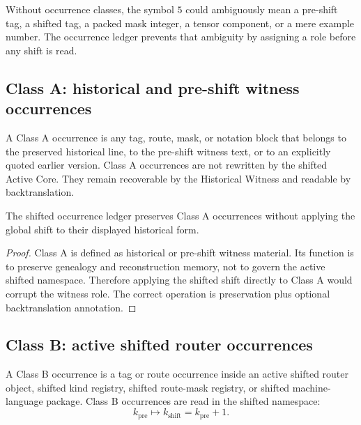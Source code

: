 \begin{remark}
\label{rem:v400-r02-why-occurrence-classes-needed}
Without occurrence classes, the symbol $5$ could ambiguously mean a pre-shift tag,
a shifted tag, a packed mask integer, a tensor component, or a mere example number.
The occurrence ledger prevents that ambiguity by assigning a role before any
shift is read.
\end{remark}

\subsection{Class A: historical and pre-shift witness occurrences}
\label{subsec:v400-r02-class-a-historical-pre-shift}

\begin{definition}
\label{def:v400-r02-class-a-occurrence}
A Class A occurrence is any tag, route, mask, or notation block that belongs to
the preserved historical line, to the pre-shift witness text, or to an explicitly
quoted earlier version. Class A occurrences are not rewritten by the shifted Active
Core. They remain recoverable by the Historical Witness and readable by
backtranslation.
\end{definition}

\begin{lemma}
\label{lem:v400-r02-class-a-preservation}
The shifted occurrence ledger preserves Class A occurrences without applying the
global shift to their displayed historical form.
\end{lemma}

\begin{proof}
Class A is defined as historical or pre-shift witness material. Its function is
to preserve genealogy and reconstruction memory, not to govern the active shifted
namespace. Therefore applying the shifted shift directly to Class A would corrupt
the witness role. The correct operation is preservation plus optional
backtranslation annotation.
\end{proof}

\subsection{Class B: active shifted router occurrences}
\label{subsec:v400-r02-class-b-active-router}

\begin{definition}
\label{def:v400-r02-class-b-occurrence}
A Class B occurrence is a tag or route occurrence inside an active shifted router
object, shifted kind registry, shifted route-mask registry, or shifted machine-language
package. Class B occurrences are read in the shifted namespace:
\[
 k_{\mathrm{pre}}\longmapsto k_{\mathrm{shift}}=k_{\mathrm{pre}}+1.
\]
\end{definition}

